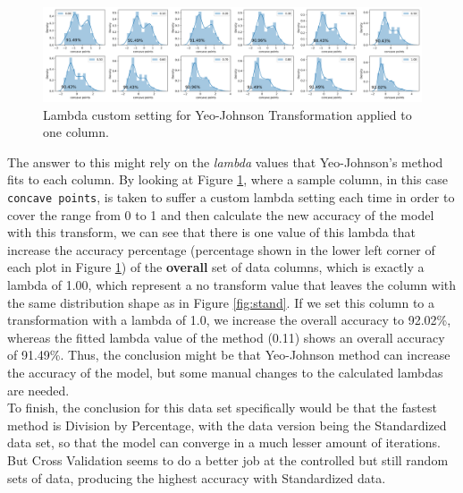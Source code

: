 \documentclass[11pt]{article}
\begin{document}
\begin{figure}[!ht]
\centering
    \includegraphics[width=7in]{lambdas.png}
    \caption{Lambda custom setting for Yeo-Johnson Transformation applied to one column.}
    \label{fig:lambdas}
\end{figure}

The answer to this might rely on the \textit{lambda} values that Yeo-Johnson's method fits to each column. By looking at Figure \ref{fig:lambdas}, where a sample column, in this case \verb$concave points$, is taken to suffer a custom lambda setting each time in order to cover the range from 0 to 1 and then calculate the new accuracy of the model with this transform, we can see that there is one value of this lambda that increase the accuracy percentage (percentage shown in the lower left corner of each plot in Figure \ref{fig:lambdas}) of the \textbf{overall} set of data columns, which is exactly a lambda of 1.00, which represent a no transform value that leaves the column with the same distribution shape as in Figure \ref{fig:stand}. If we set this column to a transformation with a lambda of 1.0, we increase the overall accuracy to 92.02\%, whereas the fitted lambda value of the method (0.11) shows an overall accuracy of 91.49\%. Thus, the conclusion might be that Yeo-Johnson method can increase the accuracy of the model, but some manual changes to the calculated lambdas are needed.
\\

To finish, the conclusion for this data set specifically would be that the fastest method is Division by Percentage, with the data version being the Standardized data set, so that the model can converge in a much lesser amount of iterations. But Cross Validation seems to do a better job at the controlled but still random sets of data, producing the highest accuracy with Standardized data.

\printbibliography
 
\end{document}
